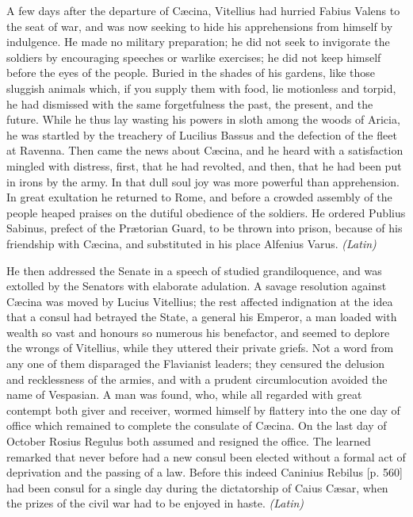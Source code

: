 A few days after the departure of Cæcina, Vitellius had hurried Fabius Valens to the seat of war, and was now seeking to hide his apprehensions from himself by indulgence. He made no military preparation; he did not seek to invigorate the soldiers by encouraging speeches or warlike exercises; he did not keep himself before the eyes of the people. Buried in the shades of his gardens, like those sluggish animals which, if you supply them with food, lie motionless and torpid, he had dismissed with the same forgetfulness the past, the present, and the future. While he thus lay wasting his powers in sloth among the woods of Aricia, he was startled by the treachery of Lucilius Bassus and the defection of the fleet at Ravenna. Then came the news about Cæcina, and he heard with a satisfaction mingled with distress, first, that he had revolted, and then, that he had been put in irons by the army. In that dull soul joy was more powerful than apprehension. In great exultation he returned to Rome, and before a crowded assembly of the people heaped praises on the dutiful obedience of the soldiers. He ordered Publius Sabinus, prefect of the Prætorian Guard, to be thrown into prison, because of his friendship with Cæcina, and substituted in his place Alfenius Varus. \emph{(Latin)}


He then addressed the Senate in a speech of studied grandiloquence, and was extolled by the Senators with elaborate adulation. A savage resolution against Cæcina was moved by Lucius Vitellius; the rest affected indignation at the idea that a consul had betrayed the State, a general his Emperor, a man loaded with wealth so vast and honours so numerous his benefactor, and seemed to deplore the wrongs of Vitellius, while they uttered their private griefs. Not a word from any one of them disparaged the Flavianist leaders; they censured the delusion and recklessness of the armies, and with a prudent circumlocution avoided the name of Vespasian. A man was found, who, while all regarded with great contempt both giver and receiver, wormed himself by flattery into the one day of office which remained to complete the consulate of Cæcina. On the last day of October Rosius Regulus both assumed and resigned the office. The learned remarked that never before had a new consul been elected without a formal act of deprivation and the passing of a law. Before this indeed Caninius Rebilus [p. 560] had been consul for a single day during the dictatorship of Caius Cæsar, when the prizes of the civil war had to be enjoyed in haste. \emph{(Latin)}

